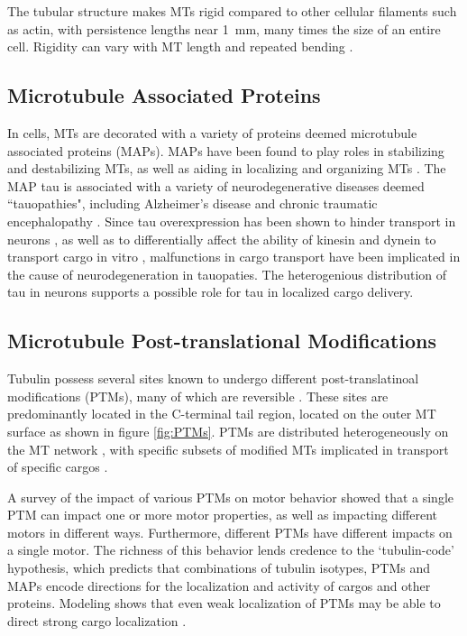 The tubular structure makes MTs rigid compared to other cellular filaments such as actin, with persistence lengths near \SI{1}{\milli\meter}, many times the size of an entire cell. Rigidity can vary with MT length and repeated bending \cite{Schaedel2015}.

\subsection{Microtubule Associated Proteins}

In cells, MTs are decorated with a variety of proteins deemed microtubule associated proteins (MAPs). MAPs have been found to play roles in stabilizing and destabilizing MTs, as well as aiding in localizing and organizing MTs \cite{Mandelkow1995}. The MAP tau is associated with a variety of neurodegenerative diseases deemed ``tauopathies", including Alzheimer's disease and chronic traumatic encephalopathy \cite{Kovacs2015}. Since tau overexpression has been shown to hinder transport in neurons \cite{Stamer2002}, as well as to differentially affect the ability of kinesin and dynein to transport cargo in vitro \cite{Vershinin2007,Vershinin2008,Dixit2008}, malfunctions in cargo transport have been implicated in the cause of neurodegeneration in tauopaties. The heterogenious distribution of tau in neurons \cite{Black1996,Kempf1996} supports a possible role for tau in localized cargo delivery.

\subsection{Microtubule Post-translational Modifications}

Tubulin possess several sites known to undergo different post-translatinoal modifications (PTMs), many of which are reversible \cite{Garnham2012}. These sites are predominantly located in the C-terminal tail region, located on the outer MT surface as shown in figure \ref{fig:PTMs}. PTMs are distributed heterogeneously on the MT network \cite{Garnham2012}, with specific subsets of modified MTs implicated in transport of specific cargos \cite{Herms2015}.

A survey of the impact of various PTMs on motor behavior \cite{Sirajuddin2014} showed that a single PTM can impact one or more motor properties, as well as impacting different motors in different ways. Furthermore, different PTMs have different impacts on a single motor. The richness of this behavior lends credence to the `tubulin-code' hypothesis, which predicts that combinations of tubulin isotypes, PTMs and MAPs encode directions for the localization and activity of cargos and other proteins. Modeling shows that even weak localization of PTMs may be able to direct strong cargo localization \cite{Iniguez2016}.


